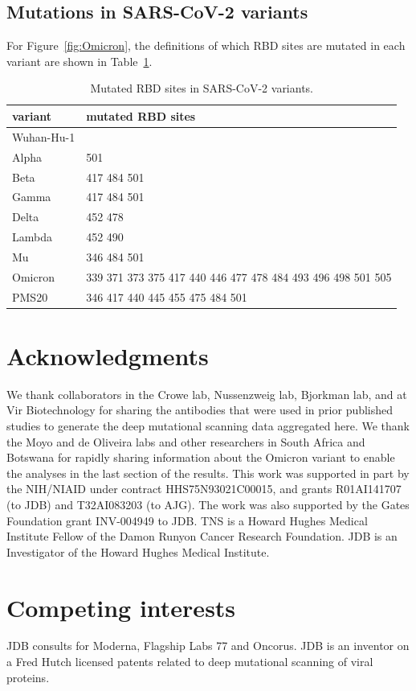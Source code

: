 \documentclass[9pt,twocolumn,twoside]{gsajnl_modified}
\begin{document}
{\subsection{Mutations in SARS-CoV-2 variants}
For Figure~\ref{fig:Omicron}, the definitions of which RBD sites are mutated in each variant are shown in Table~\ref{tab:variants}.
\begin{table}[h]
{\footnotesize
\begin{tabular}{ll}
\toprule
   variant &                                           mutated RBD sites \\
\midrule
Wuhan-Hu-1 &                                                             \\
     Alpha &                                                         501 \\
      Beta &                                                 417 484 501 \\
     Gamma &                                                 417 484 501 \\
     Delta &                                                     452 478 \\
    Lambda &                                                     452 490 \\
        Mu &                                                 346 484 501 \\
   Omicron & 339 371 373 375 417 440 446 477 478 484 493 496 498 501 505 \\
     PMS20 &                             346 417 440 445 455 475 484 501 \\
\bottomrule
\end{tabular}
}
\caption{Mutated RBD sites in SARS-CoV-2 variants.}
\label{tab:variants}
\end{table}

\section{Acknowledgments}
We thank collaborators in the Crowe lab, Nussenzweig lab, Bjorkman lab, and at Vir Biotechnology for sharing the antibodies that were used in prior published studies to generate the deep mutational scanning data aggregated here.
We thank the Moyo and de Oliveira labs and other researchers in South Africa and Botswana for rapidly sharing information about the Omicron variant to enable the analyses in the last section of the results.
This work was supported in part by the NIH/NIAID under contract HHS75N93021C00015, and grants R01AI141707 (to JDB) and T32AI083203 (to AJG).
The work was also supported by the Gates Foundation grant INV-004949 to JDB.
TNS is a Howard Hughes Medical Institute Fellow of the Damon Runyon Cancer Research Foundation.
JDB is an Investigator of the Howard Hughes Medical Institute.

\section{Competing interests}
JDB consults for Moderna, Flagship Labs 77 and Oncorus.
JDB is an inventor on a Fred Hutch licensed patents related to deep mutational scanning of viral proteins.


}
\end{document}
